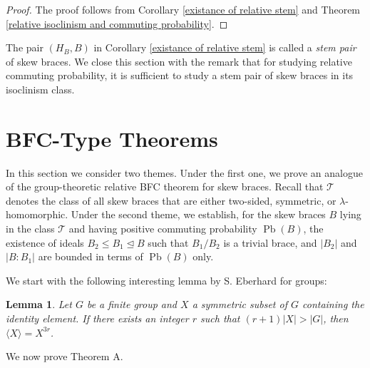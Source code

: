 \documentclass[11pt, oneside]{amsart}
\numberwithin{equation}{section}
\theoremstyle{plain}
\newtheorem{lem}[equation]{Lemma}
\theoremstyle{definition}
\newcommand{\Pb}{\operatorname{Pb} }
\newcommand{\normaleq}{\trianglelefteq}
\begin{document}
\begin{proof}
    The proof follows from Corollary \ref{existance of relative stem} and Theorem \ref{relative isoclinism and commuting probability}.
\end{proof}


The pair $(H_B,B)$ in Corollary \ref{existance of relative stem} is called a \emph{stem pair} of skew braces. We close this section with the remark that for studying relative commuting probability, it is sufficient to study a stem pair of skew braces in its isoclinism class.




  
\section{ BFC-Type Theorems}
 
In this section we consider two themes. Under the first one, we prove an analogue of the group-theoretic relative BFC theorem for skew braces. Recall that $\mathcal{T}$ denotes the class of all skew braces that are either two-sided, symmetric, or $\lambda$-homomorphic. Under the second theme, we establish, for the skew braces $B$ lying in the class $\mathcal{T}$ and having positive commuting probability $\Pb(B)$, the existence of ideals $B_2 \leqslant B_1 \normaleq B$ such that $B_1/B_2$ is a trivial brace, and $|B_2|$ and $|B:B_1|$ are bounded in terms of $\Pb(B)$ only.  

 We start with the following interesting lemma by S. Eberhard \cite{SE15} for groups:
\begin{lem}\label{Eb-lem}
 Let $G$ be a finite group and $X$ a symmetric subset of $G$ containing the identity element. If there exists an integer $r$ such that  $(r + 1)|X|>|G|$, then $\langle X\rangle=X^{3r}$.
\end{lem}

We now prove Theorem A.
\end{document}
